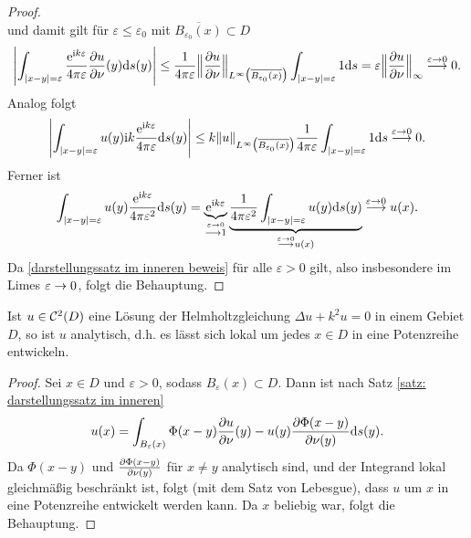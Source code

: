 \begin{proof}
\begin{equation*}
	\end{equation*}
	und damit gilt für \(\varepsilon\leq\varepsilon_0\) mit \(\overline{B_{\varepsilon_0}(x)}\subset D\)
	\begin{equation*}
		\left|\int_{|x-y|=\varepsilon}\frac{\mathrm{e}^{\mathrm{i} k\varepsilon}}{4\pi\varepsilon}\frac{\partial u}{\partial\nu}(y)\mathrm{d}s(y)\right|\leq\frac{1}{4\pi\varepsilon}\Big\|\frac{\partial u}{\partial\nu}\Big\|_{L^\infty\big(\overline{B_{\varepsilon_0}(x)}\big)}\int_{|x-y|=\varepsilon}1\mathrm{d}s=\varepsilon\Big\|\frac{\partial u}{\partial\nu}\Big\|_\infty\overset{\varepsilon\rightarrow0}{\longrightarrow}0.
	\end{equation*}
	Analog folgt
	\begin{equation*}
		\left|\int_{|x-y|=\varepsilon}u(y)\mathrm{i} k\frac{\mathrm{e}^{\mathrm{i} k\varepsilon}}{4\pi\varepsilon}\mathrm{d}s(y)\right|
		\leq k\|u\|_{L^\infty\big(\overline{B_{\varepsilon_0}(x)}\big)}\frac{1}{4\pi\varepsilon}\int_{|x-y|=\varepsilon}1\mathrm{d}s
		\overset{\varepsilon\rightarrow0}{\longrightarrow}0.
	\end{equation*}
	Ferner ist
	\begin{equation*}
		\int_{|x-y|=\varepsilon}u(y)\frac{\mathrm{e}^{\mathrm{i} k\varepsilon}}{4\pi\varepsilon^2}\mathrm{d}s(y)
		=\underbrace{\mathrm{e}^{\mathrm{i} k\varepsilon}}_{\overset{\varepsilon\rightarrow0}{\longrightarrow1}}
		\underbrace{\frac{1}{4\pi\varepsilon^2}\int_{|x-y|=\varepsilon}u(y)\mathrm{d}s(y)}_{\overset{\varepsilon\rightarrow0}{\longrightarrow}u(x)}\overset{\varepsilon\rightarrow0}{\longrightarrow}u(x).
	\end{equation*}
	Da \eqref{darstellungssatz im inneren beweis} für alle \(\varepsilon>0\) gilt, also insbesondere im Limes \(\varepsilon\rightarrow0\), folgt die Behauptung.
\end{proof}
\begin{thm}\label{Theorem analytizität}
	Ist \(u\in\mathcal{C}^2(D)\) eine Lösung der Helmholtzgleichung \(\Delta u+k^2u=0\) in einem Gebiet \(D\), so ist \(u\) analytisch, d.h. es lässt sich lokal um jedes \(x\in D\) in eine Potenzreihe entwickeln.
\end{thm}
\begin{proof}
	Sei \(x\in D\) und \(\varepsilon>0\), sodass \(B_\varepsilon(x)\subset D\). Dann ist nach Satz \ref{satz: darstellungssatz im inneren}
	\begin{equation*}
		u(x)=\int_{B_\varepsilon(x)}\Phi(x-y)\frac{\partial u}{\partial\nu}(y)-u(y)\frac{\partial\Phi(x-y)}{\partial\nu(y)}\mathrm{d}s(y).
	\end{equation*}
	Da \(\Phi(x-y)\) und \(\frac{\partial\Phi(x-y)}{\partial\nu(y)}\) für \(x\neq y\) analytisch sind, und der Integrand lokal gleichmäßig beschränkt ist, folgt (mit dem Satz von Lebesgue), dass \(u\) um \(x\) in eine Potenzreihe entwickelt werden kann. Da \(x\) beliebig war, folgt die Behauptung.
\end{proof}
